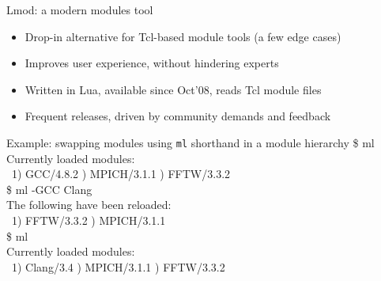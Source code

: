 \documentclass[10pt,xcolor={usenames,dvipsnames}]{beamer}
\begin{document}
\begin{frame}{Lmod: a modern modules tool}
\begin{itemize}
    \item
        Drop-in alternative for Tcl-based module tools (a few edge cases)
    \item
        Improves user experience, without hindering experts
    \item
        Written in Lua, available since Oct'08, reads Tcl module files
    \item
        Frequent releases, driven by community demands and feedback
\end{itemize}
\quad\quad
\begin{minipage}{0.9\textwidth}
    \begin{exampleblock}{\footnotesize Example: swapping modules using \texttt{ml} shorthand in a module hierarchy}
        \scriptsize
        \ttfamily
        \$ ml\\
        Currently loaded modules:\\
        ~1) GCC/4.8.2 ) MPICH/3.1.1 ) FFTW/3.3.2\\
        \$ ml -GCC Clang\\
        The following have been reloaded:\\
        ~1) FFTW/3.3.2 ) MPICH/3.1.1\\
        \$ ml\\
        Currently loaded modules:\\
        ~1) Clang/3.4 ) MPICH/3.1.1 ) FFTW/3.3.2
    \end{exampleblock}
\end{minipage}
\end{frame}

\end{document}
